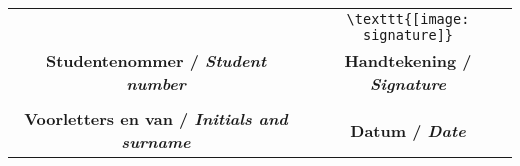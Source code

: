 \vspace{2ex}
\begin{tabularx}{1.0\linewidth}{|C|C|}
		\hline
		\Studentnumber & \vspace{0.5pt} {\small \verb+\texttt{[image: signature]}+} \\ %
		{\footnotesize \textbf{Studentenommer / \textit{Student number}}} & {\footnotesize \textbf{Handtekening / \textit{Signature}}} \\
		\hline
		\textsc{\Author} & { \SignedDate}  \\
		\raggedright \vspace{0.1cm} {\footnotesize \textbf{Voorletters en van / \textit{Initials and surname}}} & \vspace{0.1 cm} {\footnotesize \textbf{Datum / \textit{Date}}} \\
		\hline
\end{tabularx}